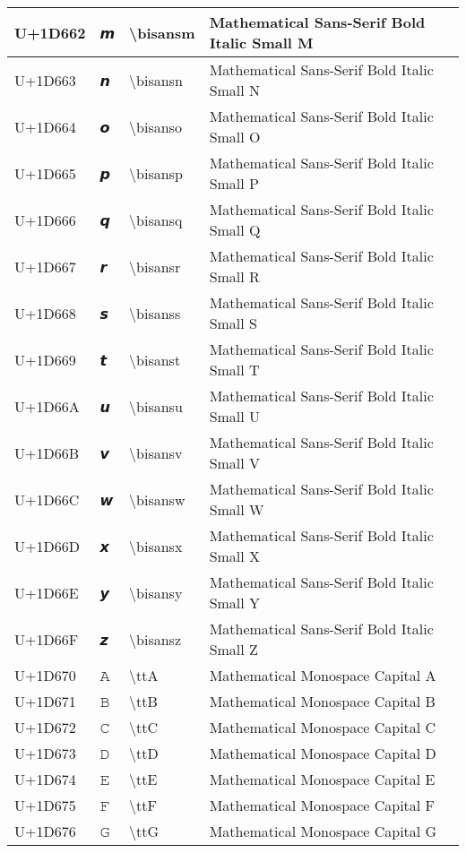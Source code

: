 \begin{table}[h]
\begin{tabulary}{\linewidth}{|L|L|L|L|}
\hline
U+1D662 & 𝙢 & {\textbackslash}bisansm & Mathematical Sans-Serif Bold Italic Small M \\
\hline
U+1D663 & 𝙣 & {\textbackslash}bisansn & Mathematical Sans-Serif Bold Italic Small N \\
\hline
U+1D664 & 𝙤 & {\textbackslash}bisanso & Mathematical Sans-Serif Bold Italic Small O \\
\hline
U+1D665 & 𝙥 & {\textbackslash}bisansp & Mathematical Sans-Serif Bold Italic Small P \\
\hline
U+1D666 & 𝙦 & {\textbackslash}bisansq & Mathematical Sans-Serif Bold Italic Small Q \\
\hline
U+1D667 & 𝙧 & {\textbackslash}bisansr & Mathematical Sans-Serif Bold Italic Small R \\
\hline
U+1D668 & 𝙨 & {\textbackslash}bisanss & Mathematical Sans-Serif Bold Italic Small S \\
\hline
U+1D669 & 𝙩 & {\textbackslash}bisanst & Mathematical Sans-Serif Bold Italic Small T \\
\hline
U+1D66A & 𝙪 & {\textbackslash}bisansu & Mathematical Sans-Serif Bold Italic Small U \\
\hline
U+1D66B & 𝙫 & {\textbackslash}bisansv & Mathematical Sans-Serif Bold Italic Small V \\
\hline
U+1D66C & 𝙬 & {\textbackslash}bisansw & Mathematical Sans-Serif Bold Italic Small W \\
\hline
U+1D66D & 𝙭 & {\textbackslash}bisansx & Mathematical Sans-Serif Bold Italic Small X \\
\hline
U+1D66E & 𝙮 & {\textbackslash}bisansy & Mathematical Sans-Serif Bold Italic Small Y \\
\hline
U+1D66F & 𝙯 & {\textbackslash}bisansz & Mathematical Sans-Serif Bold Italic Small Z \\
\hline
U+1D670 & 𝙰 & {\textbackslash}ttA & Mathematical Monospace Capital A \\
\hline
U+1D671 & 𝙱 & {\textbackslash}ttB & Mathematical Monospace Capital B \\
\hline
U+1D672 & 𝙲 & {\textbackslash}ttC & Mathematical Monospace Capital C \\
\hline
U+1D673 & 𝙳 & {\textbackslash}ttD & Mathematical Monospace Capital D \\
\hline
U+1D674 & 𝙴 & {\textbackslash}ttE & Mathematical Monospace Capital E \\
\hline
U+1D675 & 𝙵 & {\textbackslash}ttF & Mathematical Monospace Capital F \\
\hline
U+1D676 & 𝙶 & {\textbackslash}ttG & Mathematical Monospace Capital G \\

\end{tabulary}
\end{table}
